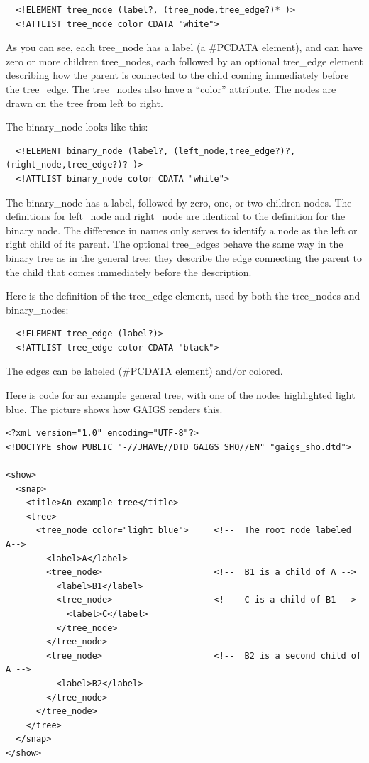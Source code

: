 \documentclass[12pt]{article}
\begin{document}
\footnotesize \begin{verbatim}
  <!ELEMENT tree_node (label?, (tree_node,tree_edge?)* )>
  <!ATTLIST tree_node color CDATA "white">
\end{verbatim} \normalsize

As you can see, each tree\_node has a label (a \#PCDATA element), and
can have zero or more children tree\_nodes, each followed by an
optional tree\_edge element describing how the parent is connected to
the child coming immediately before the tree\_edge. The tree\_nodes also
have a ``color'' attribute. The nodes are drawn on the tree from left
to right.

The binary\_node looks like this:

\footnotesize \begin{verbatim}
  <!ELEMENT binary_node (label?, (left_node,tree_edge?)?, (right_node,tree_edge?)? )>
  <!ATTLIST binary_node color CDATA "white">
\end{verbatim} \normalsize  

The binary\_node has a label, followed by zero, one, or two children
nodes. The definitions for left\_node and right\_node are identical to
the definition for the binary node. The difference in names only
serves to identify a node as the left or right child of its parent.
The optional tree\_edges behave the same way in the binary tree as in
the general tree: they describe the edge connecting the parent to the
child that comes immediately before the description.

Here is the definition of the tree\_edge element, used by both the
tree\_nodes and binary\_nodes:

\footnotesize \begin{verbatim}
  <!ELEMENT tree_edge (label?)>
  <!ATTLIST tree_edge color CDATA "black">
\end{verbatim} \normalsize

The edges can be labeled (\#PCDATA element) and/or colored.

Here is code for an example general tree, with one of the nodes
highlighted light blue. The picture shows how GAIGS renders this.

\footnotesize \begin{verbatim}
<?xml version="1.0" encoding="UTF-8"?>
<!DOCTYPE show PUBLIC "-//JHAVE//DTD GAIGS SHO//EN" "gaigs_sho.dtd">

<show>
  <snap>
    <title>An example tree</title>
    <tree>
      <tree_node color="light blue">     <!--  The root node labeled A-->
        <label>A</label>
        <tree_node>                      <!--  B1 is a child of A -->
          <label>B1</label>
          <tree_node>                    <!--  C is a child of B1 -->
            <label>C</label>
          </tree_node>
        </tree_node>
        <tree_node>                      <!--  B2 is a second child of A -->
          <label>B2</label>
        </tree_node>
      </tree_node>
    </tree>
  </snap>
</show>
\end{verbatim} \normalsize
\end{document}
